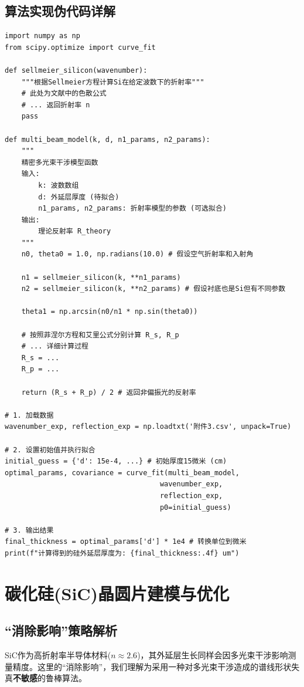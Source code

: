 \documentclass[UTF8, 11pt]{ctexart}
\begin{document}
\subsection{算法实现伪代码详解}
\begin{lstlisting}[caption={非线性最小二乘法拟合Python伪代码}, label={lst:nlls}]
import numpy as np
from scipy.optimize import curve_fit

def sellmeier_silicon(wavenumber):
    """根据Sellmeier方程计算Si在给定波数下的折射率"""
    # 此处为文献中的色散公式
    # ... 返回折射率 n
    pass

def multi_beam_model(k, d, n1_params, n2_params):
    """
    精密多光束干涉模型函数
    输入:
        k: 波数数组
        d: 外延层厚度 (待拟合)
        n1_params, n2_params: 折射率模型的参数 (可选拟合)
    输出:
        理论反射率 R_theory
    """
    n0, theta0 = 1.0, np.radians(10.0) # 假设空气折射率和入射角
    
    n1 = sellmeier_silicon(k, **n1_params)
    n2 = sellmeier_silicon(k, **n2_params) # 假设衬底也是Si但有不同参数
    
    theta1 = np.arcsin(n0/n1 * np.sin(theta0))
    
    # 按照菲涅尔方程和艾里公式分别计算 R_s, R_p
    # ... 详细计算过程
    R_s = ...
    R_p = ...
    
    return (R_s + R_p) / 2 # 返回非偏振光的反射率

# 1. 加载数据
wavenumber_exp, reflection_exp = np.loadtxt('附件3.csv', unpack=True)

# 2. 设置初始值并执行拟合
initial_guess = {'d': 15e-4, ...} # 初始厚度15微米 (cm)
optimal_params, covariance = curve_fit(multi_beam_model,
                                     wavenumber_exp,
                                     reflection_exp,
                                     p0=initial_guess)

# 3. 输出结果
final_thickness = optimal_params['d'] * 1e4 # 转换单位到微米
print(f"计算得到的硅外延层厚度为: {final_thickness:.4f} um")
\end{lstlisting}

\section{碳化硅(SiC)晶圆片建模与优化}
\subsection{“消除影响”策略解析}
SiC作为高折射率半导体材料($n \approx 2.6$)，其外延层生长同样会因多光束干涉影响测量精度。这里的“消除影响”，我们理解为采用一种对多光束干涉造成的谱线形状失真\textbf{不敏感}的鲁棒算法。
\end{document}
